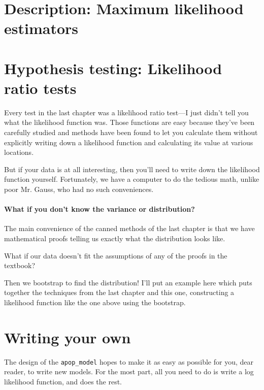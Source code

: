 \section{Description: Maximum likelihood estimators} 



\section{Hypothesis testing: Likelihood ratio tests} Every test
in the last chapter was a likelihood ratio test---I just didn't tell
you what the likelihood function was. Those functions are easy because
they've been carefully studied and methods have been found to let you
calculate them without explicitly writing down a likelihood function
and calculating its value at various locations.

But if your data is at all interesting, then you'll need to write down
the likelihood function yourself.  Fortunately, we have a computer to
do the tedious math, unlike poor Mr. Gauss, who had no such conveniences.


\paragraph{What if you don't know the variance or distribution?} 
The main convenience of the canned methods of the last
chapter is that we have mathematical proofs telling us exactly what the distribution looks like. 

What if our data doesn't fit the assumptions of any of the proofs in the textbook?

Then we bootstrap to find the distribution! I'll put an example here which puts together the techniques
from the last chapter and this one, constructing a likelihood function like the one above using the
bootstrap.

\section{Writing your own}
The design of the {\tt apop\_\-model} hopes to make it as easy as possible for you,
dear reader, to write new models. For the most part, all you need to
do is write a log likelihood function, and 
does the rest.


